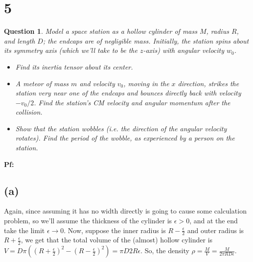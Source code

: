 \documentclass{article}
\newtheorem{question}{Question}
\begin{document}
\break

\section*{5}
\begin{question}\label{q5}
    Model a space station as a hollow cylinder of mass $M$, radius $R$, and length $D$; the endcaps are of negligible mass. Initially, the station spins about its symmetry axis (which we'll take to be the $z$-axis) with angular velocity $w_0$.
    \begin{itemize}
        \item[(a)] Find its inertia tensor about its center.
        \item[(b)] A meteor of mass $m$ and velocity $v_0$, moving in the $x$ direction, strikes the station very near one of the endcaps and bounces directly back with velocity $-v_0/2$. Find the station's CM velocity and angular momentum after the collision.
        \item[(c)] Show that the station wobbles (i.e. the direction of the angular velocity rotates). Find the period of the wobble, as experienced by a person on the station.  
    \end{itemize}
\end{question}

\textbf{Pf:}
\subsection*{(a)}
Again, since assuming it has no width directly is going to cause some calculation problem, so we'll assume the thickness of the cylinder is $\epsilon>0$, and at the end take the limit $\epsilon\rightarrow 0$. Now, suppose the inner radius is $R-\frac{\epsilon}{2}$ and outer radius is $R+\frac{\epsilon}{2}$, we get that the total volume of the (almost) hollow cylinder is $V=D\pi((R+\frac{\epsilon}{2})^2-(R-\frac{\epsilon}{2})^2) = \pi D2R\epsilon$. So, the density $\rho = \frac{M}{V}=\frac{M}{2\pi RD\epsilon}$.
\end{document}
